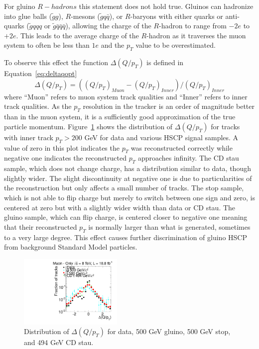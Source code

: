 For gluino $R-hadrons$ this statement does not hold true. Gluinos can hadronize into glue balls ($\tilde{g}g$), $R$-mesons ($\tilde{g} q \bar{q}$), or
$R$-baryons  with either quarks or anti-quarks ($\tilde{g} qqq$ or $\tilde{g} \bar{q}\bar{q}\bar{q}$),
allowing the charge of the $R$-hadron to range from $-2e$ to $+2e$. This leads to the
average charge of the $R$-hadron as it traverses the muon system to often be less than $1e$ and the $p_T$ value to be overestimated.

To observe this effect the function
$\Delta(Q/p_T)$ is defined in Equation~\ref{eq:deltaqopt}
\begin{equation}
\Delta(Q/p_T) = ((Q/p_T)_{Muon} - (Q/p_T)_{Inner})/(Q/p_T)_{Inner}
\label{eq:deltaqopt}
\end{equation}
where ``Muon'' refers to muon system track qualities and ``Inner'' refers to
inner track qualities. As the $p_T$ resolution in the tracker is an order of magnitude better than in the muon system, it is a sufficiently good approximation
of the true particle momentum. Figure~\ref{fig:MuOnlyInvPtDiff} shows the distribution of
$\Delta(Q/p_T)$ for tracks with inner track $p_T > 200$ GeV
for data and various HSCP signal samples.
A value of zero in this plot indicates the $p_T$ was reconstructed correctly
while negative one indicates the reconstructed $p_T$ approaches infinity.
The CD stau sample, which does not change charge,
has a distribution similar to data, though slightly wider.
The slight discontinuity at negative one is due to particularities of the reconstruction but only affects a small number of tracks.
The stop sample, which is not able to flip charge but merely to switch
between one sign and zero, is centered at zero but with a slightly wider
width than data or CD stau.
The gluino sample, which can flip charge, is centered closer to negative one meaning that
their reconstructed $p_T$ is normally larger than what is generated, sometimes
to a very large degree.  This effect causes further discrimination of gluino HSCP
from background Standard Model particles.

\begin{figure}
 \begin{center}
  \includegraphics[width=0.44\textwidth]{figures/muonly/Selection_Comp_Signal_8TeV_InnerInvPtDiff_BS}
 \end{center}
 \caption{Distribution of $\Delta(Q/p_T)$
    for data, 500 GeV gluino, 500 GeV stop, and 494 GeV CD stau.
    \label{fig:MuOnlyInvPtDiff}}
\end{figure}

